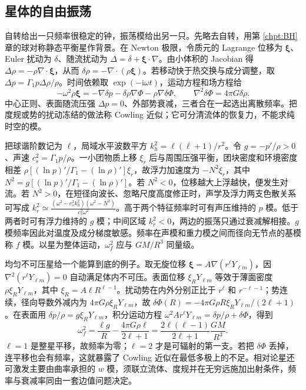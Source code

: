\subsection{星体的自由振荡}

自转给出一只频率很稳定的钟，振荡模给出另一只。先略去自转，用第 \ref{chpt:BH} 章的球对称静态平衡星作背景。在 Newton 极限，令质元的 Lagrange 位移为 $\bm\xi$、Euler 扰动为 $\delta$、随流扰动为 $\Delta=\delta+\bm\xi\cdot\nabla$。由小体积的 Jacobian 得 $\Delta\rho=-\rho\nabla\cdot\bm\xi$，从而 $\delta\rho=-\nabla\cdot(\rho\bm\xi)$。若移动快于热交换与成分调整，取 $\Delta p=\Gamma_1 p\Delta\rho/\rho$。时间依赖取 $\exp(-\mathrm i\omega t)$，运动方程和场方程给
\[
 -\omega^2\rho\bm\xi=-\nabla\delta p-\delta\rho\nabla\Phi
                      -\rho\nabla\delta\Phi,\qquad
 \nabla^2\delta\Phi=4\pi G\delta\rho .
\]
中心正则、表面随流压强 $\Delta p=0$、外部势衰减，三者合在一起选出离散频率。把度规或势的扰动冻结的做法称 Cowling 近似；它可分清流体的恢复力，不能求纯时空的模。

把球谐阶数记为 $\ell$，局域水平波数平方 $k_h^2=\ell(\ell+1)/r^2$。令 $g=-p'/\rho>0$、声速 $c_s^2=\Gamma_1p/\rho$。一小团物质上移 $\xi_r$ 后与周围压强平衡，团块密度和环境密度相差 $\rho[(\ln p)'/\Gamma_1-(\ln\rho)']\xi_r$，故浮力加速度为 $-N^2\xi_r$，其中 $N^2=g[(\ln p)'/\Gamma_1-(\ln\rho)']$。若 $N^2<0$，位移越大上浮越快，便发生对流。若 $N^2>0$，在短径向波长、忽略尺度高度修正时，声学及浮力两支色散关系可写成 $k_r^2\simeq\frac{(\omega^2-c_s^2k_h^2)(\omega^2-N^2)} {c_s^2\omega^2}$。高于两个特征频率时可有声压维持的 $p$ 模。低于两者时可有浮力维持的 $g$ 模；中间区域 $k_r^2<0$，两边的振荡只通过衰减解相接。$g$ 模频率因此对温度及成分梯度敏感。频率在声模和重力模之间而径向无节点的基模称 $f$ 模。以星为整体运动，$\omega_f^2$ 应与 $GM/R^3$ 同量级。

均匀不可压星给一个能算到底的例子。取无旋位移 $\bm\xi=A\nabla(r^\ell Y_{\ell m})$，因 $\nabla^2(r^\ell Y_{\ell m})=0$ 自动满足体内不可压。表面位移 $\xi_R Y_{\ell m}$ 等效于薄面密度 $\rho\xi_R Y_{\ell m}$，其中 $\xi_R=A\ell R^{\ell-1}$。扰动势在内外分别正比于 $r^\ell$ 和 $r^{-\ell-1}$；势连续，径向导数外减内为 $4\pi G\rho\xi_R Y_{\ell m}$，故 $\delta\Phi(R)=-4\pi G\rho R\xi_R Y_{\ell m}/(2\ell+1)$。在表面用 $\delta p/\rho=g\xi_R Y_{\ell m}$，积分运动方程 $\omega^2 A r^\ell Y_{\ell m}=\delta p/\rho+\delta\Phi$，得到
\[
 \omega_f^2=\frac{\ell g}{R}-\frac{4\pi G\rho\ell}{2\ell+1}
            =\frac{2\ell(\ell-1)}{2\ell+1}\frac{GM}{R^3}.
\]
$\ell=1$ 是整星平移，故频率为零；$\ell=2$ 才是可辐射的第一支。若把 $\delta\Phi$ 丢掉，连平移也会有频率，这就暴露了 Cowling 近似在最低多极上的不足。相对论星还可激发主要由曲率承担的 $w$ 模，须联立流体、度规并在无穷远施加出射条件，频率与衰减率同由一套边值问题决定。

